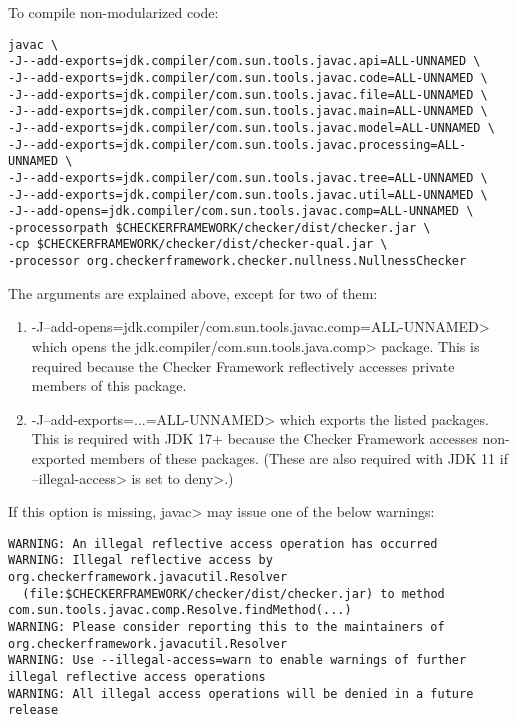 
To compile non-modularized code:

\begin{Verbatim}
javac \
-J--add-exports=jdk.compiler/com.sun.tools.javac.api=ALL-UNNAMED \
-J--add-exports=jdk.compiler/com.sun.tools.javac.code=ALL-UNNAMED \
-J--add-exports=jdk.compiler/com.sun.tools.javac.file=ALL-UNNAMED \
-J--add-exports=jdk.compiler/com.sun.tools.javac.main=ALL-UNNAMED \
-J--add-exports=jdk.compiler/com.sun.tools.javac.model=ALL-UNNAMED \
-J--add-exports=jdk.compiler/com.sun.tools.javac.processing=ALL-UNNAMED \
-J--add-exports=jdk.compiler/com.sun.tools.javac.tree=ALL-UNNAMED \
-J--add-exports=jdk.compiler/com.sun.tools.javac.util=ALL-UNNAMED \
-J--add-opens=jdk.compiler/com.sun.tools.javac.comp=ALL-UNNAMED \
-processorpath $CHECKERFRAMEWORK/checker/dist/checker.jar \
-cp $CHECKERFRAMEWORK/checker/dist/checker-qual.jar \
-processor org.checkerframework.checker.nullness.NullnessChecker
\end{Verbatim}

The arguments are explained above, except for two of them:
\begin{enumerate}

\item \<-J--add-opens=jdk.compiler/com.sun.tools.javac.comp=ALL-UNNAMED> which
opens the \<jdk.compiler/com.sun.tools.java.comp> package.  This is
required because the Checker Framework reflectively accesses private members of this package.

\item \<-J--add-exports=...=ALL-UNNAMED> which exports the listed packages.  This is
required with JDK 17+ because the Checker Framework accesses non-exported members of these packages.
(These are also required with JDK 11 if \<--illegal-access> is set to \<deny>.)

\end{enumerate}

If this option is missing, \<javac> may issue one of the below warnings:
\begin{Verbatim}
WARNING: An illegal reflective access operation has occurred
WARNING: Illegal reflective access by org.checkerframework.javacutil.Resolver
  (file:$CHECKERFRAMEWORK/checker/dist/checker.jar) to method com.sun.tools.javac.comp.Resolve.findMethod(...)
WARNING: Please consider reporting this to the maintainers of org.checkerframework.javacutil.Resolver
WARNING: Use --illegal-access=warn to enable warnings of further illegal reflective access operations
WARNING: All illegal access operations will be denied in a future release
\end{Verbatim}

